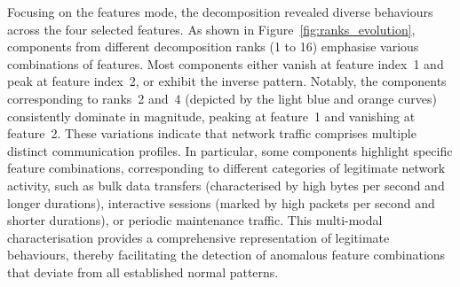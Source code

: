 \documentclass[preprint,12pt,authoryear]{elsarticle}
\begin{document}
Focusing on the features mode, the decomposition revealed diverse behaviours across the four selected features. As shown in Figure~\ref{fig:ranks_evolution}, components from different decomposition ranks (1 to 16) emphasise various combinations of features. Most components either vanish at feature index~1 and peak at feature index~2, or exhibit the inverse pattern. Notably, the components corresponding to ranks~2 and~4 (depicted by the light blue and orange curves) consistently dominate in magnitude, peaking at feature~1 and vanishing at feature~2. These variations indicate that network traffic comprises multiple distinct communication profiles. In particular, some components highlight specific feature combinations, corresponding to different categories of legitimate network activity, such as bulk data transfers (characterised by high bytes per second and longer durations), interactive sessions (marked by high packets per second and shorter durations), or periodic maintenance traffic. This multi-modal characterisation provides a comprehensive representation of legitimate behaviours, thereby facilitating the detection of anomalous feature combinations that deviate from all established normal patterns.
\end{document}
